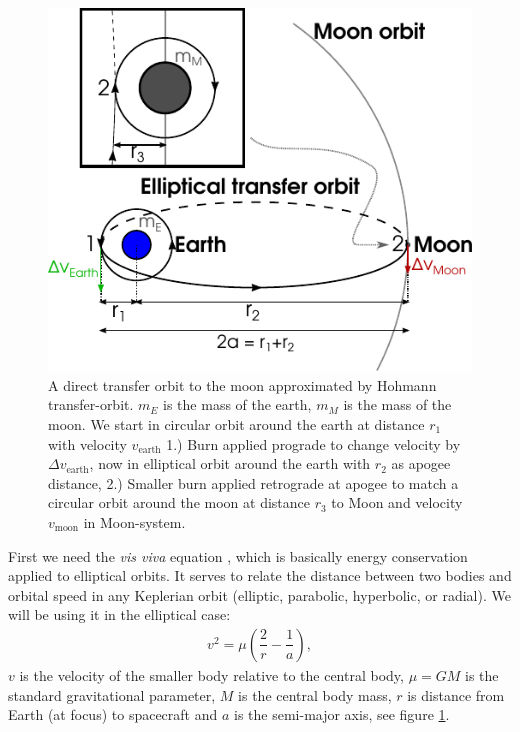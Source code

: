 \begin{figure}[ht!]
\centering
\includegraphics[scale=1.4]{fig/hohmann_moon.pdf}
\caption{A direct transfer orbit to the moon approximated by Hohmann transfer-orbit. $m_E$ is the mass of the earth, $m_M$ is the mass of the moon. We start in circular orbit around the earth at distance $r_1$ with velocity $v_{\text{earth}}$ 1.) Burn applied prograde to change velocity by $\Delta v_{\text{earth}}$, now in elliptical orbit around the earth with $r_2$ as apogee distance, 2.) Smaller burn applied retrograde at apogee to match a circular orbit around the moon at distance $r_3$ to Moon and velocity $v_{\text{moon}}$ in Moon-system.}
\label{fig:hohmann-moon}
\end{figure}

First we need the \emph{vis viva} equation \cite{Pisacane2005}, which is basically energy conservation applied to elliptical orbits. It serves to relate the distance between two bodies and orbital speed in any Keplerian orbit (elliptic, parabolic, hyperbolic, or radial). We will be using it in the elliptical case:
\begin{align}
v^2 = \mu \left(\dfrac{2}{r} - \dfrac{1}{a} \right) \label{eq:vis-viva} ,
\end{align}
$v$ is the velocity of the smaller body relative to the central body, $\mu=G M$ is the standard gravitational parameter, $M$ is the central body mass, $r$ is distance from Earth (at focus) to spacecraft and $a$ is the semi-major axis, see figure \ref{fig:hohmann-moon}.


